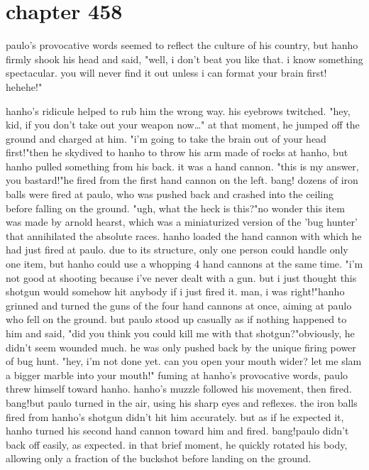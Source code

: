 \section{chapter 458}

paulo's provocative words seemed to reflect the culture of his country, but hanho firmly shook his head and said, "well, i don't beat you like that.
 i know something spectacular.
 you will never find it out unless i can format your brain first! hehehe!"




hanho's ridicule helped to rub him the wrong way.
 his eyebrows twitched.
"hey, kid, if you don't take out your weapon now…" at that moment, he jumped off the ground and charged at him.
 "i'm going to take the brain out of your head first!"then he skydived to hanho to throw his arm made of rocks at hanho, but hanho pulled something from his back.
 it was a hand cannon.
"this is my answer, you bastard!"he fired from the first hand cannon on the left.
bang! dozens of iron balls were fired at paulo, who was pushed back and crashed into the ceiling before falling on the ground.
 "ugh, what the heck is this?"no wonder this item was made by arnold hearst, which was a miniaturized version of the 'bug hunter' that annihilated the absolute races.
hanho loaded the hand cannon with which he had just fired at paulo.
due to its structure, only one person could handle only one item, but hanho could use a whopping 4 hand cannons at the same time.
"i'm not good at shooting because i've never dealt with a gun.
 but i just thought this shotgun would somehow hit anybody if i just fired it.
 man, i was right!"hanho grinned and turned the guns of the four hand cannons at once, aiming at paulo who fell on the ground.
 but paulo stood up casually as if nothing happened to him and said, "did you think you could kill me with that shotgun?"obviously, he didn't seem wounded much.
 he was only pushed back by the unique firing power of bug hunt.
"hey, i'm not done yet.
 can you open your mouth wider? let me slam a bigger marble into your mouth!"
fuming at hanho's provocative words, paulo threw himself toward hanho.
 hanho's muzzle followed his movement, then fired.
bang!but paulo turned in the air, using his sharp eyes and reflexes.
 the iron balls fired from hanho's shotgun didn't hit him accurately.
 but as if he expected it, hanho turned his second hand cannon toward him and fired.
bang!paulo didn't back off easily, as expected.
 in that brief moment, he quickly rotated his body, allowing only a fraction of the buckshot before landing on the ground.
